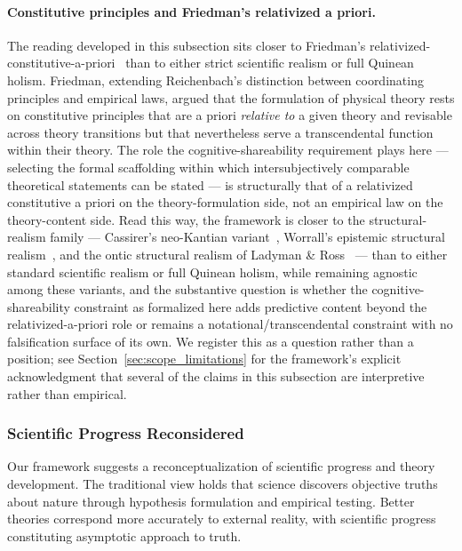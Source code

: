 \documentclass[11pt]{article}
\begin{document}
\paragraph{Constitutive principles and Friedman's relativized a priori.} The reading developed in this subsection sits closer to Friedman's relativized-constitutive-a-priori~\cite{Friedman2001} than to either strict scientific realism or full Quinean holism. Friedman, extending Reichenbach's distinction between coordinating principles and empirical laws, argued that the formulation of physical theory rests on constitutive principles that are a priori \emph{relative to} a given theory and revisable across theory transitions but that nevertheless serve a transcendental function within their theory. The role the cognitive-shareability requirement plays here — selecting the formal scaffolding within which intersubjectively comparable theoretical statements can be stated — is structurally that of a relativized constitutive a priori on the theory-formulation side, not an empirical law on the theory-content side. Read this way, the framework is closer to the structural-realism family — Cassirer's neo-Kantian variant~\cite{Cassirer1923}, Worrall's epistemic structural realism~\cite{Worrall1989}, and the ontic structural realism of Ladyman \& Ross~\cite{Ladyman2007} — than to either standard scientific realism or full Quinean holism, while remaining agnostic among these variants, and the substantive question is whether the cognitive-shareability constraint as formalized here adds predictive content beyond the relativized-a-priori role or remains a notational/transcendental constraint with no falsification surface of its own. We register this as a question rather than a position; see Section~\ref{sec:scope_limitations} for the framework's explicit acknowledgment that several of the claims in this subsection are interpretive rather than empirical.


\subsubsection{Scientific Progress Reconsidered}

Our framework suggests a reconceptualization of scientific progress and theory development. The traditional view holds that science discovers objective truths about nature through hypothesis formulation and empirical testing. Better theories correspond more accurately to external reality, with scientific progress constituting asymptotic approach to truth.
\end{document}
